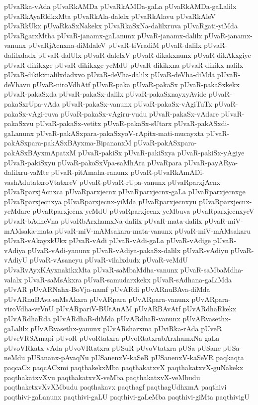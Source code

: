 {pUvaRka-vAda
pUvaRkAMDa
pUvaRkAMDa-gaLa
pUvaRkAMDa-gaLalilx
pUvaRkAyaRkikxMta
pUvaRkAla-dalelx
pUvaRkAlavu
pUvaRkAleV
pUvaRkUkx
pUvaRkaSxNakekx
pUvaRkaSxNa-dalilxruva
pUvaRgati-yiMda
pUvaRgarxMtha
pUvaR-janamx-gaLanunx
pUvaR-janamx-dalilx
pUvaR-janamx-vanunx
pUvaRjAcnxna-diMdaleV
pUvaR-tiVradiM
pUvaR-dalilx
pUvaR-dalilxdadx
pUvaR-dalUlx
pUvaR-dalelxV
pUvaR-dikakxnunx
pUvaR-dikAkxgiye
pUvaR-dikikxge
pUvaR-dikikxge-yeMdU
pUvaR-dikikxna
pUvaR-dikikx-nalilx
pUvaR-dikikxnalilxdadxvo
pUvaR-deVha-dalilx
pUvaR-deVha-diMda
pUvaR-deVhavu
pUvaR-niroVdhAtf
pUvaR-paka
pUvaR-pakaSx
pUvaR-pakaSxkekx
pUvaR-pakaSxda
pUvaR-pakaSx-dalilx
pUvaR-pakaSxnayxyAvide
pUvaR-pakaSxrUpa-vAda
pUvaR-pakaSx-vanunx
pUvaR-pakaSx-vAgiTuTx
pUvaR-pakaSx-vAgi-ruva
pUvaR-pakaSx-vAgiru-vudu
pUvaR-pakaSx-vAdare
pUvaR-pakaSxvu
pUvaR-pakaSx-vetitx
pUvaR-pakaSx-sUtarx
pUvaR-pakASxdi-gaLanunx
pUvaR-pakASxpara-pakaSxyoV-rApitx-mati-mucayxta
pUvaR-pakASxpara-pakASxBAyxma-BipananxM
pUvaR-pakASxpara-pakASxBAyxmApatxM
pUvaR-pakiSx
pUvaR-pakiSxya
pUvaR-pakiSx-yAgiye
pUvaR-pakiSxyu
pUvaR-pakoSxVpa-saMhAra
pUvaRpara
pUvaR-payARya-dalilxru-vaMte
pUvaR-pitAmaha-ranunx
pUvaR-pUvaRkAmADi-vashAdutatxroVtatxreV
pUvaR-pUvaR-rUpa-vanunx
pUvaRparxjAcnx
pUvaRparxjAcnxca
pUvaRparxjecnx
pUvaRparxjecnx-gaLa
pUvaRparxjecnxge
pUvaRparxjecnxya
pUvaRparxjecnx-yiMda
pUvaRparxjecnxyu
pUvaRparxjecnx-yeMdare
pUvaRparxjecnx-yeMdU
pUvaRparxjecnx-yeMbuva
pUvaRparxjecnxyeV
pUvaR-bAdheVna
pUvaRbArxhamxNa-dalilx
pUvaR-mata-dalilx
pUvaR-miV-mAMsaka-mata
pUvaR-miV-mAMsakara-mata-vanunx
pUvaR-miV-mAMsakaru
pUvaR-vAkayxkUkx
pUvaR-vAdi
pUvaR-vAdi-gaLa
pUvaR-vAdige
pUvaR-vAdiya
pUvaR-vAdi-yanunx
pUvaR-vAdiya-pakaSx-dalilx
pUvaR-vAdiyu
pUvaR-vAdiyU
pUvaR-vAsaneyu
pUvaR-vilalxdudx
pUvaR-veMdU
pUvaRvAyxKAyxnakikxMta
pUvaR-saMbaMdha-vanunx
pUvaR-saMbaMdha-valalx
pUvaR-saMsAkxra
pUvaR-samudarxkekx
pUvaR-sAdhana-gaLiMda
pUvAR
pUvARNahx-BoVja-namf
pUvARdi
pUvARnuBAva-diMda
pUvARnuBAva-saMsAkxra
pUvARpara
pUvARpara-vanunx
pUvARpara-viroVdha-veVnU
pUvARpariV-BUtAnAM
pUvARBAvAtf
pUvARdhaRkekx
pUvARdhaRda
pUvARdhaR-diMda
pUvARdhaR-vanunx
pUvARvasethx-gaLalilx
pUvARvasethx-yanunx
pUvARsharxma
pUviRka-rAda
pUveR
pUveVRSAmapi
pUvoR
pUvoRtatxra
pUvoRtatxrabArxhamxNa-gaLa
pUvoVRkatx-vAda
pUvoVRtatxra
pUSuR
pUvoVtatxra
pUSa
pUSane
pUSa-neMdu
pUSananx-pAvaqNu
pUSanenxV-kaSeR
pUSanenxV-kaSeVR
paqkaqta
paqcaCx
paqcACxmi
paqthakekxMba
paqthakatxvX
paqthakatxvX-guNakekx
paqthakatxvXvu
paqthakatxvX-veMba
paqthakatxvX-veMbudu
paqthaketxvXvXMbudu
paqthakavx
paqthagf
paqthagUdhxmA
paqthivi
paqthivi-gaLanunx
paqthivi-gaLU
paqthivi-gaLeMba
paqthivi-giMta
paqthivigU
}
